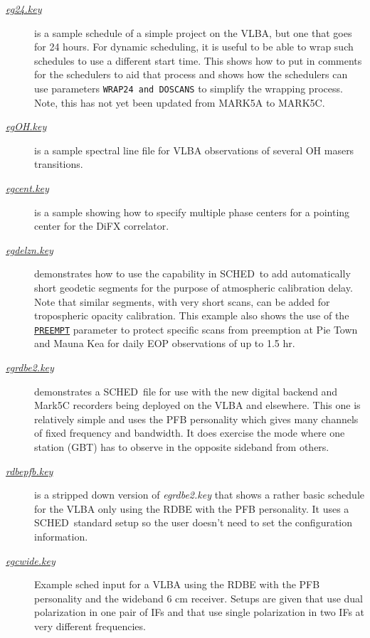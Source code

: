 \documentclass{report}
\newcommand{\schedb}{{\sc SCHED~}}
\begin{document}
\begin{description}
\item[
{\href{examples/eg24.key}{{\sl eg24.key}}}] is a
sample schedule of a simple project on the VLBA, but one that goes
for 24 hours.  For dynamic scheduling, it is useful to be able to
wrap such schedules to use a different start time.  This shows how
to put in comments for the schedulers to aid that process and shows
how the schedulers can use parameters {\tt WRAP24 and DOSCANS} to
simplify the wrapping process.  Note, this has not yet been updated
from MARK5A to MARK5C.

\item[
{\href{examples/egOH.key}{{\sl egOH.key}}}] is a
sample spectral line file for VLBA
observations of several OH masers transitions.

\item[
{\href{examples/egcent.key}{{\sl egcent.key}}}] is
a sample showing how to specify multiple phase centers for a pointing
center for the DiFX correlator.

\item[
{\href{examples/egdelzn.key}{{\sl egdelzn.key}}}]
demonstrates how to use the capability in \schedb to add automatically
short geodetic segments for the purpose of atmospheric calibration
delay.  Note that similar segments, with very short scans, can be added
for tropospheric opacity calibration.  This example also shows the use
of the 
{\hyperref[MP:PREEMPT]{{\tt PREEMPT}}} parameter to protect
specific scans from preemption at Pie Town and Mauna Kea for daily
EOP observations of up to 1.5 hr.

\item[
{\href{examples/egrdbe2.key}{{\sl egrdbe2.key}}}]
demonstrates a \schedb file for use with the new digital backend and
Mark5C recorders being deployed on the VLBA and elsewhere.  This one
is relatively simple and uses the PFB personality which gives many
channels of fixed frequency and bandwidth.  It does exercise the
mode where one station (GBT) has to observe in the opposite sideband
from others.

\item[
{\href{examples/rdbepfb.key}{{\sl rdbepfb.key}}}]
is a stripped down version of {\sl egrdbe2.key} that shows a rather
basic schedule for the VLBA only using the RDBE with the PFB personality.
It uses a \schedb standard setup so the user doesn't need to set
the configuration information.

\item[
{\href{examples/egcwide.key}{{\sl egcwide.key}}}]
Example sched input for a VLBA using the RDBE with the PFB personality
and the wideband 6 cm receiver.  Setups are given that use dual
polarization in one pair of IFs and that use single polarization in
two IFs at very different frequencies.


\end{description}
\end{document}
